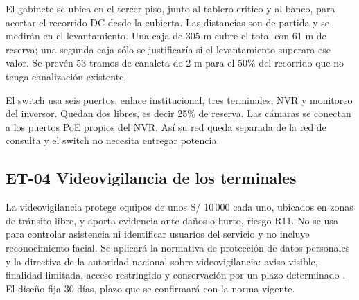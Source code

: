 El gabinete se ubica en el tercer piso, junto al tablero crítico y al banco, para acortar el recorrido DC desde la cubierta. Las distancias son de partida y se medirán en el levantamiento. Una caja de 305 m cubre el total con 61 m de reserva; una segunda caja sólo se justificaría si el levantamiento superara ese valor. Se prevén 53 tramos de canaleta de 2 m para el 50\% del recorrido que no tenga canalización existente.

El switch usa seis puertos: enlace institucional, tres terminales, NVR y monitoreo del inversor. Quedan dos libres, es decir 25\% de reserva. Las cámaras se conectan a los puertos PoE propios del NVR. Así su red queda separada de la red de consulta y el switch no necesita entregar potencia.

\subsection{ET-04 Videovigilancia de los terminales}
La videovigilancia protege equipos de unos S/ 10\,000 cada uno, ubicados en zonas de tránsito libre, y aporta evidencia ante daños o hurto, riesgo R11. No se usa para controlar asistencia ni identificar usuarios del servicio y no incluye reconocimiento facial. Se aplicará la normativa de protección de datos personales y la directiva de la autoridad nacional sobre videovigilancia: aviso visible, finalidad limitada, acceso restringido y conservación por un plazo determinado \cite{datos}. El diseño fija 30 días, plazo que se confirmará con la norma vigente.

